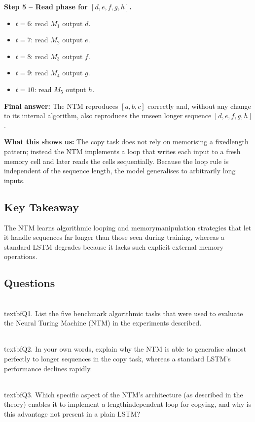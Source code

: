 \documentclass[12pt, a4paper]{article}
\begin{document}
{\textbf{Step 5 -- Read phase for $[d,e,f,g,h]$.}  
\begin{itemize}
\item $t=6$: read $M_{1}$ \rightarrow output $d$.
\item $t=7$: read $M_{2}$ \rightarrow output $e$.
\item $t=8$: read $M_{3}$ \rightarrow output $f$.
\item $t=9$: read $M_{4}$ \rightarrow output $g$.
\item $t=10$: read $M_{5}$ \rightarrow output $h$.
\end{itemize}

\textbf{Final answer:}  The NTM reproduces $[a,b,c]$ correctly and, without any change to its internal algorithm, also reproduces the unseen longer sequence $[d,e,f,g,h]$.

\textbf{What this shows us:}  The copy task does not rely on memorising a fixedlength pattern; instead the NTM implements a loop that writes each input to a fresh memory cell and later reads the cells sequentially.  Because the loop rule is independent of the sequence length, the model generalises to arbitrarily long inputs.

\subsection{Key Takeaway}
The NTM learns algorithmic looping and memorymanipulation strategies that let it handle sequences far longer than those seen during training, whereas a standard LSTM degrades because it lacks such explicit external memory operations.

\newpage
\subsection*{Questions}

\\textbf{Q1.} List the five benchmark algorithmic tasks that were used to evaluate the Neural Turing Machine (NTM) in the experiments described.

\\textbf{Q2.} In your own words, explain why the NTM is able to generalise almost perfectly to longer sequences in the copy task, whereas a standard LSTM's performance declines rapidly.

\\textbf{Q3.} Which specific aspect of the NTM's architecture (as described in the theory) enables it to implement a lengthindependent loop for copying, and why is this advantage not present in a plain LSTM?

}
\end{document}

